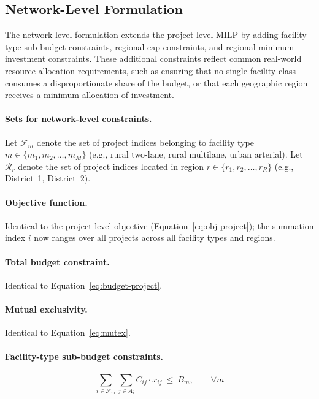 \subsection{Network-Level Formulation}
\label{sec:milp-network}

The network-level formulation extends the project-level MILP by adding
facility-type sub-budget constraints, regional cap constraints, and regional
minimum-investment constraints. These additional constraints reflect common
real-world resource allocation requirements, such as ensuring that no single
facility class consumes a disproportionate share of the budget, or that each
geographic region receives a minimum allocation of investment.

\paragraph{Sets for network-level constraints.}
Let $\mathcal{F}_m$ denote the set of project indices belonging to facility
type $m \in \{m_1, m_2, \ldots, m_M\}$ (e.g., rural two-lane, rural multilane,
urban arterial). Let $\mathcal{R}_r$ denote the set of project indices located
in region $r \in \{r_1, r_2, \ldots, r_R\}$ (e.g., District~1, District~2).

\paragraph{Objective function.} Identical to the project-level objective
(Equation~\ref{eq:obj-project}); the summation index $i$ now ranges over all
projects across all facility types and regions.

\paragraph{Total budget constraint.} Identical to
Equation~\ref{eq:budget-project}.

\paragraph{Mutual exclusivity.} Identical to Equation~\ref{eq:mutex}.

\paragraph{Facility-type sub-budget constraints.}
\begin{equation}
\sum_{i \in \mathcal{F}_m} \sum_{j \in A_i} C_{ij} \cdot x_{ij}\ \leq\ B_m,
\qquad \forall m
\label{eq:budget-facility}
\end{equation}

